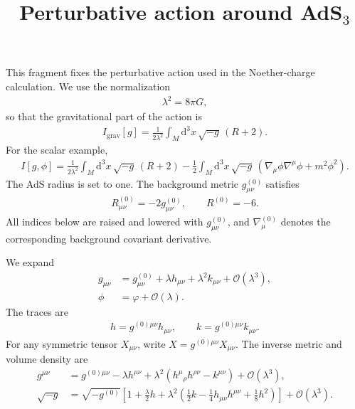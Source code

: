 \documentclass[11pt]{article}
\title{Perturbative action around AdS$_3$}
\author{}
\date{}
\newcommand{\dd}{\mathrm{d}}
\newcommand{\cO}{\mathcal{O}}
\begin{document}
\maketitle

This fragment fixes the perturbative action used in the Noether-charge
calculation. We use the normalization
\begin{align}
  \lambda^2=8\pi G,
\end{align}
so that the gravitational part of the action is
\begin{align}
  I_{\mathrm{grav}}[g]
  =\frac{1}{2\lambda^2}\int_M \dd^3x\,\sqrt{-g}\,(R+2).
\end{align}
For the scalar example,
\begin{align}
  I[g,\phi]
  =\frac{1}{2\lambda^2}\int_M \dd^3x\,\sqrt{-g}\,(R+2)
  -\frac12\int_M \dd^3x\,\sqrt{-g}\,
  \left(\nabla_\mu\phi\nabla^\mu\phi+m^2\phi^2\right).
\end{align}
The AdS radius is set to one. The background metric $g^{(0)}_{\mu\nu}$
satisfies
\begin{align}
  R^{(0)}_{\mu\nu}=-2g^{(0)}_{\mu\nu},
  \qquad
  R^{(0)}=-6.
\end{align}
All indices below are raised and lowered with $g^{(0)}_{\mu\nu}$, and
$\nabla^{(0)}_\mu$ denotes the corresponding background covariant derivative.

We expand
\begin{align}
  g_{\mu\nu}
  &=g^{(0)}_{\mu\nu}+\lambda h_{\mu\nu}
    +\lambda^2 k_{\mu\nu}+\cO(\lambda^3),\\
  \phi&=\varphi+\cO(\lambda).
\end{align}
The traces are
\begin{align}
  h=g^{(0)\mu\nu}h_{\mu\nu},
  \qquad
  k=g^{(0)\mu\nu}k_{\mu\nu}.
\end{align}
For any symmetric tensor $X_{\mu\nu}$, write
$X=g^{(0)\mu\nu}X_{\mu\nu}$. The inverse metric and volume density are
\begin{align}
  g^{\mu\nu}
  &=g^{(0)\mu\nu}
    -\lambda h^{\mu\nu}
    +\lambda^2\left(h^\mu{}_\rho h^{\rho\nu}-k^{\mu\nu}\right)
    +\cO(\lambda^3),\\
  \sqrt{-g}
  &=\sqrt{-g^{(0)}}\left[
      1+\frac{\lambda}{2}h
      +\lambda^2\left(
        \frac12 k-\frac14 h_{\mu\nu}h^{\mu\nu}+\frac18 h^2
      \right)
    \right]+\cO(\lambda^3).
\end{align}
\end{document}
